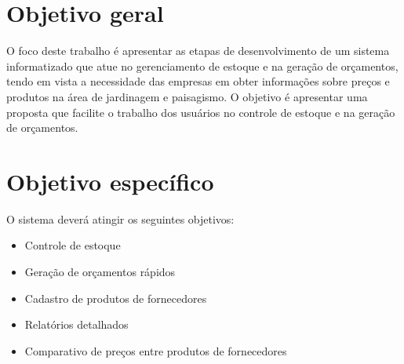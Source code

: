 \section{Objetivo geral}

    O foco deste trabalho é apresentar as etapas de desenvolvimento de um sistema informatizado que atue no gerenciamento de estoque  e na geração de orçamentos, tendo em vista a necessidade das empresas em obter informações sobre preços e produtos na área de jardinagem e paisagismo.
 O objetivo é apresentar uma proposta que facilite o trabalho dos usuários no controle de estoque e na geração de orçamentos.



\section{Objetivo específico}



O sistema deverá atingir os seguintes objetivos:

\begin{itemize}
   \item Controle de estoque
   \item Geração de orçamentos rápidos
   \item Cadastro de produtos de fornecedores
   \item Relatórios detalhados
   \item Comparativo de preços entre produtos de fornecedores

 \end{itemize}




